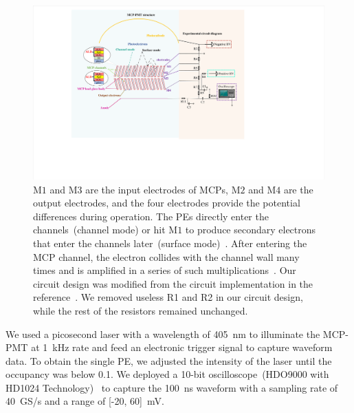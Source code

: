 \begin{figure}[!ht]
	\centering
	\includegraphics[width=\linewidth]{PMTRelated/GTmodel/set.pdf}
	\caption{
		$\mathrm{M}1$ and $\mathrm{M}3$ are the input electrodes of MCPs, $\mathrm{M}2$ and $\mathrm{M}4$ are the output electrodes,
		and the four electrodes provide the potential differences during operation.
		The PEs directly enter the channels~(channel mode) or hit $\mathrm{M}1$ to produce secondary electrons
		that enter the channels later~(surface mode)~\cite{2016Optimization}. After entering the MCP channel, the electron collides
		with the channel wall many times and is amplified in a series of such multiplications~\cite{1955Scintillation}.
		Our circuit design was modified from the circuit implementation in the reference~\cite{Luo:2023jdf}.
		We removed useless R1 and R2 in our circuit design, while the rest of the resistors remained unchanged.}
	\label{fig:circuit}
\end{figure}

We used a picosecond laser with a wavelength of \SI{405}{nm} to illuminate the MCP-PMT at \SI{1}{kHz} rate and feed an electronic trigger signal to capture waveform data.
To obtain the single PE, we adjusted the intensity of the laser until the occupancy was below 0.1.
We deployed a 10-bit oscilloscope~(HDO9000 with HD1024 Technology)~\cite{teledynelecroy} to capture the \SI{100}{ns} waveform
with a sampling rate of \SI{40}{GS/s} and a range of [-20, 60]~\si{mV}.

